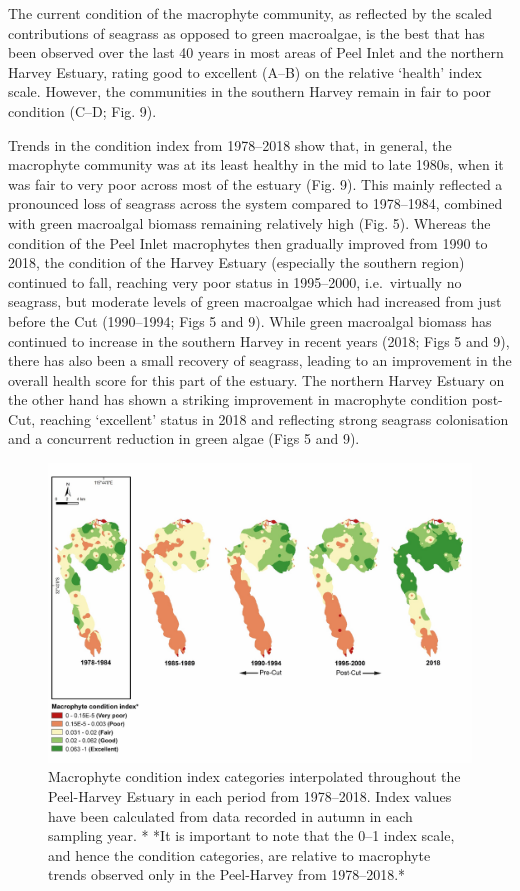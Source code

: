 \documentclass[
]{book}
\begin{document}
The current condition of the macrophyte community, as reflected by the scaled contributions of seagrass as opposed to green macroalgae, is the best that has been observed over the last 40 years in most areas of Peel Inlet and the northern Harvey Estuary, rating good to excellent (A--B) on the relative `health' index scale. However, the communities in the southern Harvey remain in fair to poor condition (C--D; Fig. 9).

Trends in the condition index from 1978--2018 show that, in general, the macrophyte community was at its least healthy in the mid to late 1980s, when it was fair to very poor across most of the estuary (Fig. 9). This mainly reflected a pronounced loss of seagrass across the system compared to 1978--1984, combined with green macroalgal biomass remaining relatively high (Fig. 5). Whereas the condition of the Peel Inlet macrophytes then gradually improved from 1990 to 2018, the condition of the Harvey Estuary (especially the southern region) continued to fall, reaching very poor status in 1995--2000, i.e.~virtually no seagrass, but moderate levels of green macroalgae which had increased from just before the Cut (1990--1994; Figs 5 and 9). While green macroalgal biomass has continued to increase in the southern Harvey in recent years (2018; Figs 5 and 9), there has also been a small recovery of seagrass, leading to an improvement in the overall health score for this part of the estuary. The northern Harvey Estuary on the other hand has shown a striking improvement in macrophyte condition post-Cut, reaching `excellent' status in 2018 and reflecting strong seagrass colonisation and a concurrent reduction in green algae (Figs 5 and 9).

\begin{figure}
\includegraphics[width=1\linewidth]{images/macrophytes/picture12} \caption{Macrophyte condition index categories interpolated throughout the Peel-Harvey Estuary in each period from 1978–2018. Index values have been calculated from data recorded in autumn in each sampling year. * *It is important to note that the 0–1 index scale, and hence the condition categories, are relative to macrophyte trends observed only in the Peel-Harvey from 1978–2018.*}\label{fig:macrophytes-pic12}
\end{figure}
\end{document}
